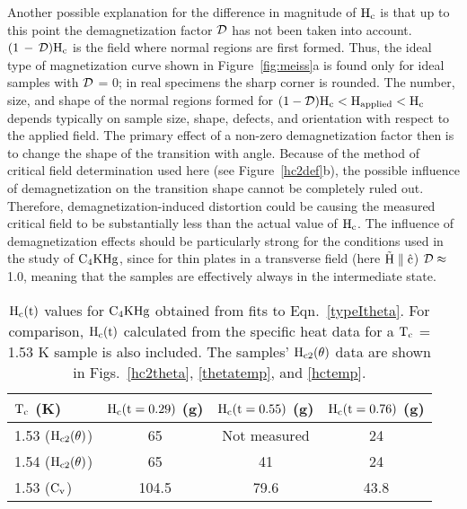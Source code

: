         Another  possible  explanation for the difference  in  magnitude of
$\rm H_c$ is that up to this point the demagnetization  factor $\cal D$ has
not been taken into account.  $\rm (1  \, - \, {\cal D})  H_c$ is the field
where normal regions  are first  formed.\cite{tinkham80,livingston69} Thus,
the ideal type  of   magnetization curve shown in  Figure~\ref{fig:meiss}a is
found only for ideal samples with $\cal D$ = 0; in real specimens the sharp
corner is  rounded.  The number,  size, and   shape of  the  normal regions
formed for  $\rm (1 - {\cal  D}) H_{c} <   H_{applied} < H_c$ depends
typically on sample size, shape, defects,  and  orientation with respect to
the applied  field.\cite{livingston69}   The primary effect  of  a non-zero
demagnetization factor then is to change the  shape of the  transition with
angle.  Because of  the method of   critical field determination used  here
(see Figure~\ref{hc2def}b), the possible influence  of demagnetization on the
transition      shape  cannot  be    completely  ruled    out.   Therefore,
demagnetization-induced distortion  could be  causing the measured critical
field to be substantially less than  the actual value of  $\rm  H_c$.   The
influence of demagnetization effects should be  particularly strong for the
conditions used in the study of  $\rm  C_4KHg$, since for  thin plates in a
transverse field (here $\rm \vec{H} \parallel  \hat{c}$)  $\cal D \approx $
1.0, meaning  that the samples  are effectively  always in the intermediate
state.\cite{livingston69}

\begin{table}
\caption[$\rm H_c$ values for $\rm C_4KHg$ obtained from fits to $\rm
H_{c2}(\theta)$ data.]{$\rm  H_c(t)$ values for $\rm C_4KHg$  obtained from
fits to  Eqn.~\ref{typeItheta}.   For  comparison, $\rm H_c(t)$  calculated
from the  specific  heat  data  for  a  $\rm T_c$ =  1.53  K sample is also
included.   The   samples'  $\rm   H_{c2}(\theta)$     data  are shown   in
Figs.~\ref{hc2theta}, \ref{thetatemp}, and \ref{hctemp}.}
\label{htherm_table}
\begin{center}
\begin{tabular}{|l|ccc|}
\hline
$\rm T_c$ (K) & $\rm H_c(t = 0.29)$ (g)& $\rm H_c(t = 0.55)$ (g)&  $\rm H_c(t =
0.76)$ (g) \\
\hline
1.53 ($\rm H_{c2}(\theta)$) & 65 & Not measured & 24 \\
1.54 ($\rm H_{c2}(\theta)$) & 65 & 41 & 24 \\
1.53 ($\rm C_v$) & 104.5 & 79.6 & 43.8 \\
\hline
\end{tabular}
\end{center}
\end{table}

